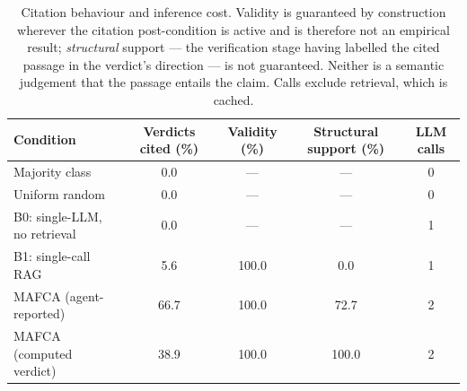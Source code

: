 \begin{table}[t]
\centering
\caption{Citation behaviour and inference cost. Validity is guaranteed by construction wherever the citation post-condition is active and is therefore not an empirical result; \emph{structural} support --- the verification stage having labelled the cited passage in the verdict's direction --- is not guaranteed. Neither is a semantic judgement that the passage entails the claim. Calls exclude retrieval, which is cached.}
\label{tab:cond:cite}
\small
\begin{tabular}{@{}lcccc@{}}
\toprule
Condition & Verdicts cited (\%) & Validity (\%) & Structural support (\%) & LLM calls \\
\midrule
Majority class & 0.0 & --- & --- & 0 \\
Uniform random & 0.0 & --- & --- & 0 \\
B0: single-LLM, no retrieval & 0.0 & --- & --- & 1 \\
B1: single-call RAG & 5.6 & 100.0 & 0.0 & 1 \\
MAFCA (agent-reported) & 66.7 & 100.0 & 72.7 & 2 \\
MAFCA (computed verdict) & 38.9 & 100.0 & 100.0 & 2 \\
\bottomrule
\end{tabular}
\end{table}
